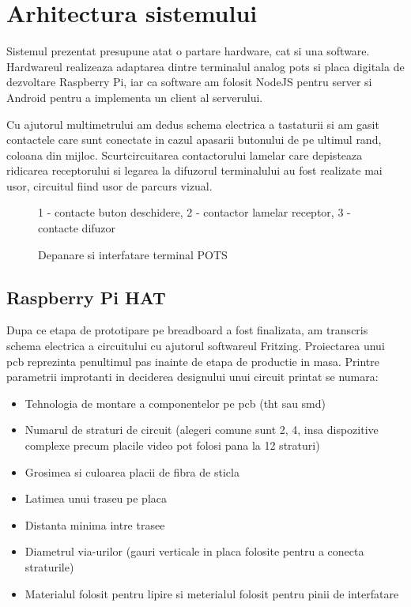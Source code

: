 \section {Arhitectura sistemului}

Sistemul prezentat presupune atat o partare hardware, cat si una software. Hardwareul realizeaza adaptarea dintre terminalul analog \acrshort{pots} si placa digitala de dezvoltare Raspberry Pi, iar ca software am folosit NodeJS pentru server si Android pentru a implementa un client al serverului.

Cu ajutorul multimetrului am dedus schema electrica a tastaturii si am gasit contactele care sunt conectate in cazul apasarii butonului de pe ultimul rand, coloana din mijloc. Scurtcircuitarea contactorului lamelar care depisteaza ridicarea receptorului si legarea la difuzorul terminalului au fost realizate mai usor, circuitul fiind usor de parcurs vizual.

\begin{figure}[h!]
  \centering
  \caption{Depanare si interfatare terminal POTS}
  \medskip
  \small
  1 - contacte buton deschidere, 2 - contactor lamelar receptor, 3 - contacte difuzor
\end{figure}


\subsection {Raspberry Pi HAT}

Dupa ce etapa de prototipare pe breadboard a fost finalizata, am transcris schema electrica a circuitului cu ajutorul softwareul Fritzing. Proiectarea unui 
\acrfull{pcb} reprezinta penultimul pas inainte de etapa de productie in masa. Printre parametrii improtanti in deciderea designului unui circuit printat se numara:

\begin{itemize}
  \item Tehnologia de montare a componentelor pe \acrshort{pcb} (\acrfull{tht} sau \acrfull{smd})
  \item Numarul de straturi de circuit (alegeri comune sunt 2, 4, insa dispozitive complexe precum placile video pot folosi pana la 12 straturi)
  \item Grosimea si culoarea placii de fibra de sticla
  \item Latimea unui traseu pe placa
  \item Distanta minima intre trasee
  \item Diametrul via-urilor (gauri verticale in placa folosite pentru a conecta straturile)
  \item Materialul folosit pentru lipire si meterialul folosit pentru pinii de interfatare
\end{itemize}

